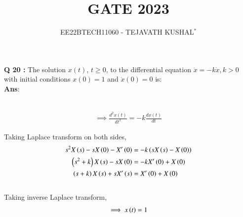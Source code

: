 \documentclass[journal,12pt,twocolumn]{IEEEtran}
\theoremstyle{remark}
\begin{document}

\vspace{3cm}

\title{GATE 2023}
\author{EE22BTECH11060 - TEJAVATH KUSHAL$^{*}$%
}
\maketitle
\newpage
\bigskip

\renewcommand{\thefigure}{\theenumi}
\renewcommand{\thetable}{\theenumi}

\maketitle
\noindent \textbf{Q 20 :} The solution \(x(t)\), \(t \geq 0\), to the differential equation
$\ddot{x} = -k\dot{x} , k > 0$
with initial conditions \(x(0) = 1\) and \(\dot{x} (0) = 0\) is: \\
\noindent \textbf{Ans}:\\ \\
\begin{table}[h]

\end{table}
\begin{align}
    \implies \frac{d^2 x(t)}{dt^2} = -k\frac{dx(t)}{dt}
\end{align}


Taking Laplace transform on both sides,
\begin{align}
    s^2 X\left(s\right) - sX\left(0\right) - X'\left(0\right) &= -k\left(sX\left(s\right) - X\left(0\right)\right) \\
    \left(s^2 + k\right)X\left(s\right) - sX\left(0\right) &= -kX'\left(0\right) + X\left(0\right) \\
    \left(s+k\right)X\left(s\right) + sX'\left(s\right) &= X'\left(0\right) + X\left(0\right)
\end{align}\\
Taking inverse Laplace transform,\\
\begin{align}
    \implies x\left(t\right) = 1
\end{align}
\end{document}
